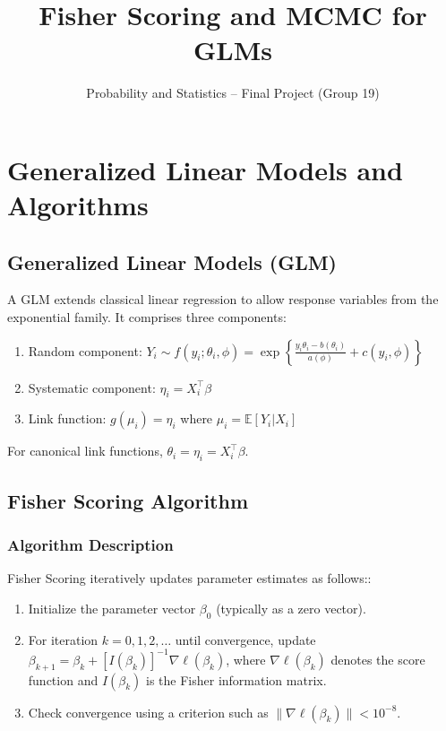 \documentclass[11pt]{article}
\title{Fisher Scoring and MCMC for GLMs}
\author{Probability and Statistics -- Final Project (Group 19)}
\date{}
\begin{document}
\maketitle
\section{Generalized Linear Models and Algorithms}

\subsection{Generalized Linear Models (GLM)}
A GLM extends classical linear regression to allow response variables from the exponential family. It comprises three components:
\begin{enumerate}[itemsep=1pt, topsep=4pt]
    \item Random component: $Y_i \sim f(y_i;\theta_i,\phi) = \exp\!\left\{\frac{y_i \theta_i - b(\theta_i)}{a(\phi)} + c(y_i,\phi)\right\}$
    \item Systematic component: $\eta_i = X_i^{\top} \beta$
    \item Link function: $g(\mu_i) = \eta_i$ where $\mu_i = \mathbb{E}[Y_i|X_i]$
\end{enumerate}

For canonical link functions, $ \theta_i = \eta_i = X_i^{\top} \beta$.

\subsection{Fisher Scoring Algorithm}
\subsubsection{Algorithm Description}\vspace{-4pt}
Fisher Scoring iteratively updates parameter estimates as follows::
\begin{enumerate}[itemsep=1.pt, topsep=4pt]
    \item Initialize the parameter vector $\beta_0$ (typically as a zero
    vector).
    \item For iteration $k = 0,1,2,\dots$ until convergence, update $\beta_{k+1} = \beta_k + \left[I(\beta_k)\right]^{-1} \nabla \ell(\beta_k)$,
     where $\nabla \ell(\beta_k)$ denotes the score function and $I(\beta_k)$ is the Fisher information matrix.
    \item Check convergence using a criterion such as $\lVert \nabla \ell(\beta_k) \rVert < 10^{-8}$.
\end{enumerate}
\end{document}
